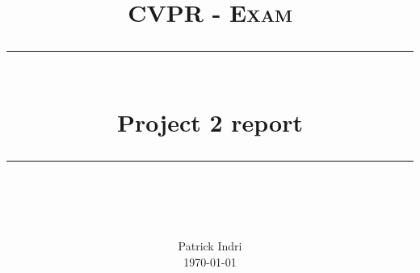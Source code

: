\newcommand{\horrule}[1]{\rule{\linewidth}{#1}} 	%

\title{
	\vspace{-1in}
	\normalfont \normalsize \textsc{CVPR - Exam} \\ [25pt]
	\horrule{0.5pt} \\[0.4cm]
	\huge Project 2 report \\
	\horrule{2pt} \\[0.5cm]
}
\author{
	\normalfont 								\normalsize
	Patrick Indri\\[-3pt]		\normalsize
	\today
}
\date{}

